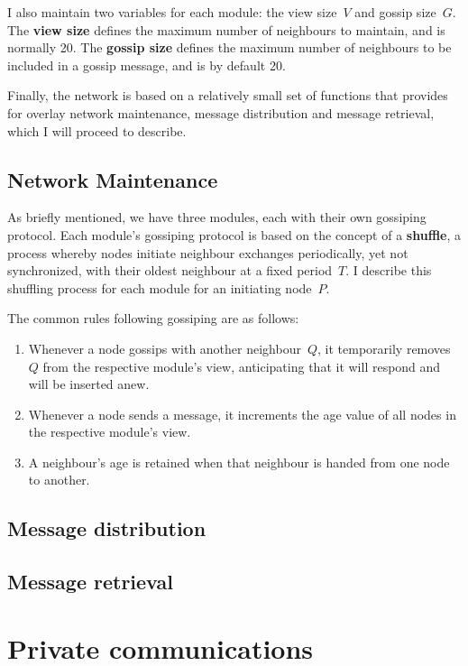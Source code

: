 \documentclass[10pt,a4paper,onecolumn]{article}
\begin{document}
I also maintain two variables for each module: the view size~$V$ and gossip size~$G$. The \textbf{view size} defines the maximum number of neighbours to maintain, and is normally 20. The \textbf{gossip size} defines the maximum number of neighbours to be included in a gossip message, and is by default 20.

Finally, the network is based on a relatively small set of functions that provides for overlay network maintenance, message distribution and message retrieval, which I will proceed to describe.

\subsection{Network Maintenance}
As briefly mentioned, we have three modules, each with their own gossiping protocol. Each module's gossiping protocol is based on the concept of a \textbf{shuffle}, a process whereby nodes initiate neighbour exchanges periodically, yet not synchronized, with their oldest neighbour at a fixed period~$T$. I describe this shuffling process for each module for an initiating node~$P$. 

The common rules following gossiping are as follows:
\begin{enumerate}
\item Whenever a node gossips with another neighbour~$Q$, it temporarily removes~$Q$ from the respective module’s view, anticipating that it will respond and will be inserted anew. 
\item Whenever a node sends a message, it increments the age value of all nodes in the respective module's view.
\item A neighbour's age is retained when that neighbour is handed from one node to another.
\end{enumerate}

\subsection{Message distribution}
\subsection{Message retrieval}

\section{Private communications}
\end{document}
